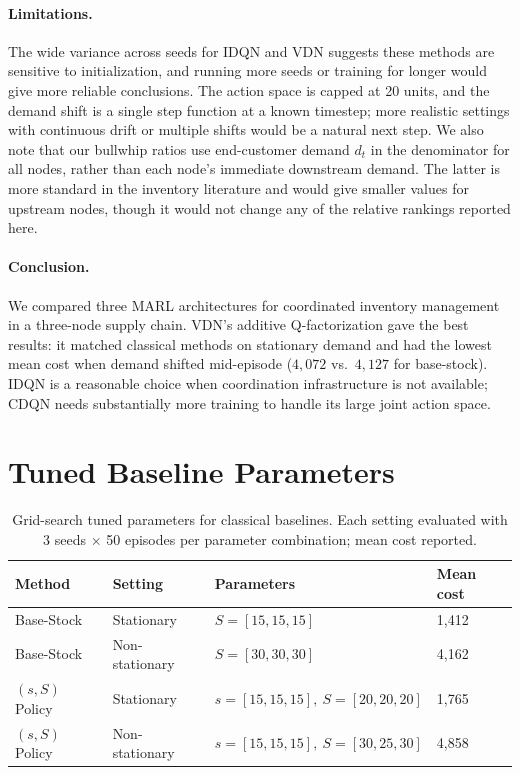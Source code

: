 \documentclass{article}
\begin{document}
\paragraph{Limitations.}
The wide variance across seeds for IDQN and VDN suggests these methods
are sensitive to initialization, and running more seeds or training for
longer would give more reliable conclusions. The action space is capped
at 20 units, and the demand shift is a single step function at a known
timestep; more realistic settings with continuous drift or multiple
shifts would be a natural next step. We also note that our bullwhip
ratios use end-customer demand $d_t$ in the denominator for all nodes,
rather than each node's immediate downstream demand. The latter is more
standard in the inventory literature and would give smaller values for
upstream nodes, though it would not change any of the relative
rankings reported here.

\paragraph{Conclusion.}
We compared three MARL architectures for coordinated inventory
management in a three-node supply chain. VDN's additive Q-factorization
gave the best results: it matched classical methods on stationary
demand and had the lowest mean cost when demand shifted mid-episode
($4{,}072$ vs.\ $4{,}127$ for base-stock). IDQN is a reasonable choice
when coordination infrastructure is not available; CDQN needs
substantially more training to handle its large joint action space.

\FloatBarrier
\appendix

\section{Tuned Baseline Parameters}
\label{app:params}

\begin{table}[H]
\centering
\caption{Grid-search tuned parameters for classical baselines.
         Each setting evaluated with 3 seeds $\times$ 50 episodes per
         parameter combination; mean cost reported.}
\label{tab:baseline_params}
\small
\begin{tabular}{llll}
\toprule
Method & Setting & Parameters & Mean cost \\
\midrule
Base-Stock    & Stationary     & $S = [15, 15, 15]$                & 1{,}412 \\
Base-Stock    & Non-stationary & $S = [30, 30, 30]$                & 4{,}162 \\
$(s,S)$ Policy & Stationary    & $s = [15,15,15],\ S = [20,20,20]$ & 1{,}765 \\
$(s,S)$ Policy & Non-stationary & $s = [15,15,15],\ S = [30,25,30]$ & 4{,}858 \\
\bottomrule
\end{tabular}
\end{table}
\end{document}
